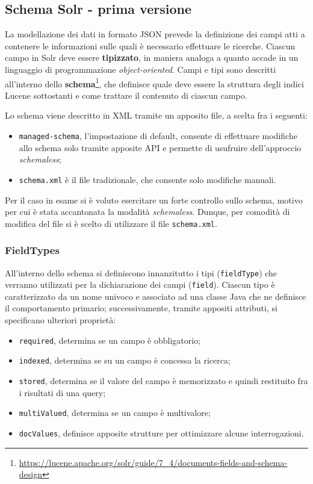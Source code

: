 \subsection{Schema Solr - prima versione}
\label{sec:schema1}

La modellazione dei dati in formato JSON prevede la definizione dei campi atti a contenere le informazioni sulle quali è necessario effettuare le ricerche. Ciascun campo in Solr deve essere \textbf{tipizzato}, in maniera analoga a quanto accade in un linguaggio di programmazione \textit{object-oriented}. Campi e tipi sono descritti all’interno dello \textbf{schema}\footnote{\url{https://lucene.apache.org/solr/guide/7\_4/documents-fields-and-schema-design}}, che definisce quale deve essere la struttura degli indici Lucene sottostanti e come trattare il contenuto di ciascun campo. 

\vspace{1em}

Lo schema viene descritto in XML tramite un apposito file, a scelta fra i seguenti:
\begin{itemize}
\item \texttt{managed-schema}, l’impostazione di default, consente di effettuare modifiche allo schema solo tramite apposite API e permette di usufruire dell’approccio \textit{schemaless};
\item \texttt{schema.xml} è il file tradizionale, che consente solo modifiche manuali.
\end{itemize}

Per il caso in esame si è voluto esercitare un forte controllo sullo schema, motivo per cui è stata accantonata la modalità \textit{schemaless}. Dunque, per comodità di modifica del file si è scelto di utilizzare il file \texttt{schema.xml}.


\pagebreak
\subsubsection{FieldTypes}

All’interno dello schema si definiscono innanzitutto i tipi (\texttt{fieldType}) che verranno utilizzati per la dichiarazione dei campi (\texttt{field}). Ciascun tipo è caratterizzato da un nome univoco e associato ad una classe Java che ne definisce il comportamento primario; successivamente, tramite appositi attributi, si specificano ulteriori proprietà:

\begin{itemize}
\item \texttt{required}, determina se un campo è obbligatorio;
\item \texttt{indexed}, determina se su un campo è concessa la ricerca;
\item \texttt{stored}, determina se il valore del campo è memorizzato e quindi restituito fra i risultati di una query;
\item \texttt{multiValued}, determina se un campo è multivalore;
\item \texttt{docValues}, definisce apposite strutture per ottimizzare alcune interrogazioni.
\end{itemize}

